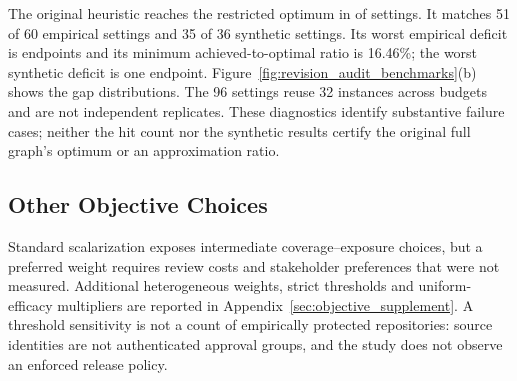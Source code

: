 The original heuristic reaches the restricted optimum in \HeuristicExactHits{} of \HeuristicExactSettings{} settings. It matches 51 of 60 empirical settings and 35 of 36 synthetic settings. Its worst empirical deficit is \HeuristicWorstGap{} endpoints and its minimum achieved-to-optimal ratio is 16.46\%; the worst synthetic deficit is one endpoint. Figure~\ref{fig:revision_audit_benchmarks}(b) shows the gap distributions. The 96 settings reuse 32 instances across budgets and are not independent replicates. These diagnostics identify substantive failure cases; neither the hit count nor the synthetic results certify the original full graph's optimum or an approximation ratio.

\subsection{Other Objective Choices}
Standard scalarization exposes intermediate coverage--exposure choices, but a preferred weight requires review costs and stakeholder preferences that were not measured. Additional heterogeneous weights, strict thresholds and uniform-efficacy multipliers are reported in Appendix~\ref{sec:objective_supplement}. A threshold sensitivity is not a count of empirically protected repositories: source identities are not authenticated approval groups, and the study does not observe an enforced release policy.
